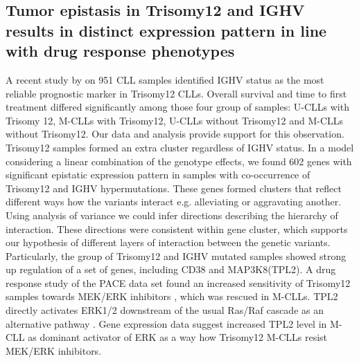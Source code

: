 \subsection{Tumor epistasis in Trisomy12 and IGHV results in distinct expression pattern in line with drug response phenotypes}
A recent study by \citet{Bulian2017} on 951 CLL samples identified IGHV status as the most reliable prognostic marker in Trisomy12 CLLs. Overall survival and time to first treatment differed significantly among those four group of samples: U-CLLs with Trisomy 12, M-CLLs with Trisomy12, U-CLLs without Trisomy12 and M-CLLs without Trisomy12. Our data and analysis provide support for this observation. Trisomy12 samples formed an extra cluster regardless of IGHV status. In a model considering a linear combination of the genotype effects, we found 602 genes with significant epistatic expression pattern in samples with co-occurrence of Trisomy12 and IGHV hypermutations. These genes formed clusters that reflect different ways how the variants interact e.g. alleviating or aggravating another. Using analysis of variance we could infer directions describing the hierarchy of interaction. These directions were consistent within gene cluster, which supports our hypothesis of different layers of interaction between the genetic variants. Particularly, the group of Trisomy12 and IGHV mutated samples showed strong up regulation of a set of genes, including CD38 and MAP3K8(TPL2). A drug response study of the PACE data set found an increased sensitivity of Trisomy12 samples towards MEK/ERK inhibitors \citep{Dietrich}, which was rescued in M-CLLs. TPL2 directly activates ERK1/2 downstream of the usual Ras/Raf cascade as an alternative pathway \citep{Rousseau2016}. Gene expression data suggest increased TPL2 level in M-CLL as dominant activator of ERK as a way how Trisomy12 M-CLLs resist MEK/ERK inhibitors.  

